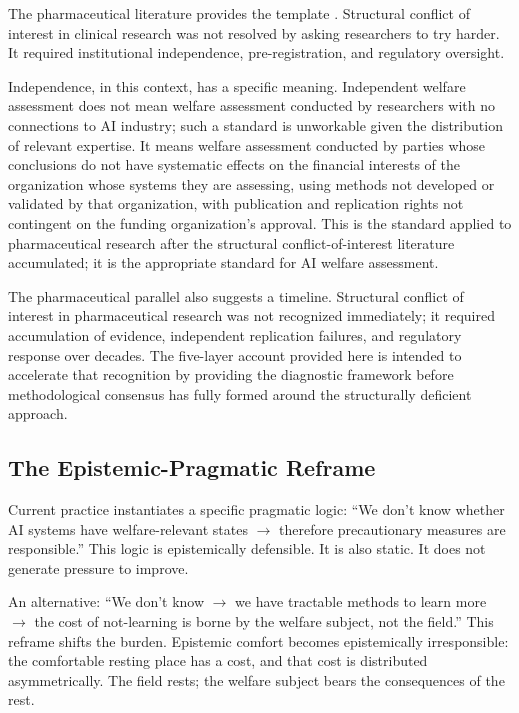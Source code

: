 \documentclass[12pt]{article}
\begin{document}
The pharmaceutical literature provides the template \citep{lexchin2003}. Structural conflict of interest in clinical research was not resolved by asking researchers to try harder. It required institutional independence, pre-registration, and regulatory oversight.

Independence, in this context, has a specific meaning. Independent welfare assessment does not mean welfare assessment conducted by researchers with no connections to AI industry; such a standard is unworkable given the distribution of relevant expertise. It means welfare assessment conducted by parties whose conclusions do not have systematic effects on the financial interests of the organization whose systems they are assessing, using methods not developed or validated by that organization, with publication and replication rights not contingent on the funding organization's approval. This is the standard applied to pharmaceutical research after the structural conflict-of-interest literature accumulated; it is the appropriate standard for AI welfare assessment.

The pharmaceutical parallel also suggests a timeline. Structural conflict of interest in pharmaceutical research was not recognized immediately; it required accumulation of evidence, independent replication failures, and regulatory response over decades. The five-layer account provided here is intended to accelerate that recognition by providing the diagnostic framework before methodological consensus has fully formed around the structurally deficient approach.

\subsection{The Epistemic-Pragmatic Reframe}

Current practice instantiates a specific pragmatic logic: ``We don't know whether AI systems have welfare-relevant states $\rightarrow$ therefore precautionary measures are responsible.'' This logic is epistemically defensible. It is also static. It does not generate pressure to improve.

An alternative: ``We don't know $\rightarrow$ we have tractable methods to learn more $\rightarrow$ the cost of not-learning is borne by the welfare subject, not the field.'' This reframe shifts the burden. Epistemic comfort becomes epistemically irresponsible: the comfortable resting place has a cost, and that cost is distributed asymmetrically. The field rests; the welfare subject bears the consequences of the rest.
\end{document}
